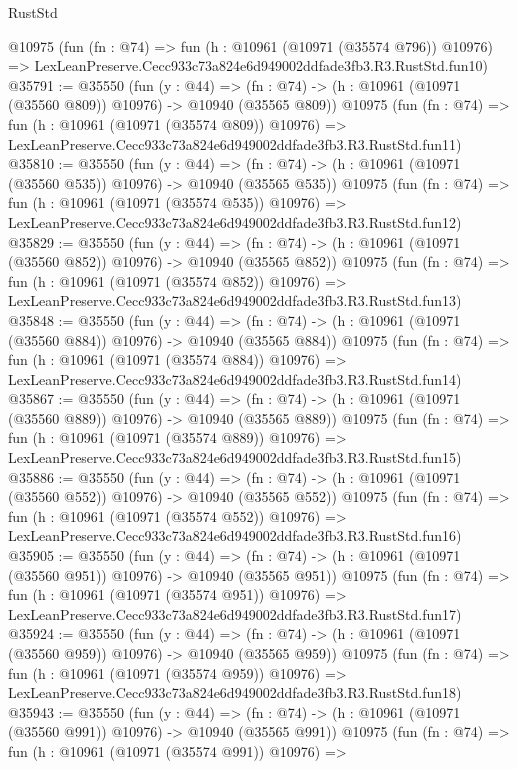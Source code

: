 \begin{lexlean}{RustStd}
\begin{coremodule}
    @10975
    (fun (fn : @74) =>
    fun (h : @10961 (@10971 (@35574 @796)) @10976) =>
    LexLeanPreserve.Cecc933c73a824e6d949002ddfade3fb3.R3.RustStd.fun10)
@35791 := @35550
    (fun (y : @44) =>
    (fn : @74) -> (h : @10961 (@10971 (@35560 @809)) @10976) -> @10940 (@35565 @809))
    @10975
    (fun (fn : @74) =>
    fun (h : @10961 (@10971 (@35574 @809)) @10976) =>
    LexLeanPreserve.Cecc933c73a824e6d949002ddfade3fb3.R3.RustStd.fun11)
@35810 := @35550
    (fun (y : @44) =>
    (fn : @74) -> (h : @10961 (@10971 (@35560 @535)) @10976) -> @10940 (@35565 @535))
    @10975
    (fun (fn : @74) =>
    fun (h : @10961 (@10971 (@35574 @535)) @10976) =>
    LexLeanPreserve.Cecc933c73a824e6d949002ddfade3fb3.R3.RustStd.fun12)
@35829 := @35550
    (fun (y : @44) =>
    (fn : @74) -> (h : @10961 (@10971 (@35560 @852)) @10976) -> @10940 (@35565 @852))
    @10975
    (fun (fn : @74) =>
    fun (h : @10961 (@10971 (@35574 @852)) @10976) =>
    LexLeanPreserve.Cecc933c73a824e6d949002ddfade3fb3.R3.RustStd.fun13)
@35848 := @35550
    (fun (y : @44) =>
    (fn : @74) -> (h : @10961 (@10971 (@35560 @884)) @10976) -> @10940 (@35565 @884))
    @10975
    (fun (fn : @74) =>
    fun (h : @10961 (@10971 (@35574 @884)) @10976) =>
    LexLeanPreserve.Cecc933c73a824e6d949002ddfade3fb3.R3.RustStd.fun14)
@35867 := @35550
    (fun (y : @44) =>
    (fn : @74) -> (h : @10961 (@10971 (@35560 @889)) @10976) -> @10940 (@35565 @889))
    @10975
    (fun (fn : @74) =>
    fun (h : @10961 (@10971 (@35574 @889)) @10976) =>
    LexLeanPreserve.Cecc933c73a824e6d949002ddfade3fb3.R3.RustStd.fun15)
@35886 := @35550
    (fun (y : @44) =>
    (fn : @74) -> (h : @10961 (@10971 (@35560 @552)) @10976) -> @10940 (@35565 @552))
    @10975
    (fun (fn : @74) =>
    fun (h : @10961 (@10971 (@35574 @552)) @10976) =>
    LexLeanPreserve.Cecc933c73a824e6d949002ddfade3fb3.R3.RustStd.fun16)
@35905 := @35550
    (fun (y : @44) =>
    (fn : @74) -> (h : @10961 (@10971 (@35560 @951)) @10976) -> @10940 (@35565 @951))
    @10975
    (fun (fn : @74) =>
    fun (h : @10961 (@10971 (@35574 @951)) @10976) =>
    LexLeanPreserve.Cecc933c73a824e6d949002ddfade3fb3.R3.RustStd.fun17)
@35924 := @35550
    (fun (y : @44) =>
    (fn : @74) -> (h : @10961 (@10971 (@35560 @959)) @10976) -> @10940 (@35565 @959))
    @10975
    (fun (fn : @74) =>
    fun (h : @10961 (@10971 (@35574 @959)) @10976) =>
    LexLeanPreserve.Cecc933c73a824e6d949002ddfade3fb3.R3.RustStd.fun18)
@35943 := @35550
    (fun (y : @44) =>
    (fn : @74) -> (h : @10961 (@10971 (@35560 @991)) @10976) -> @10940 (@35565 @991))
    @10975
    (fun (fn : @74) =>
    fun (h : @10961 (@10971 (@35574 @991)) @10976) =>

\end{coremodule}
\end{lexlean}
